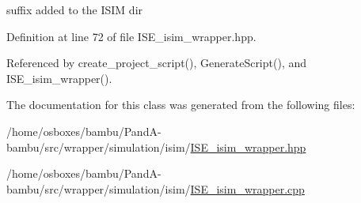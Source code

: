suffix added to the I\+S\+IM dir 



Definition at line 72 of file I\+S\+E\+\_\+isim\+\_\+wrapper.\+hpp.



Referenced by create\+\_\+project\+\_\+script(), Generate\+Script(), and I\+S\+E\+\_\+isim\+\_\+wrapper().



The documentation for this class was generated from the following files\+:\begin{DoxyCompactItemize}
\item 
/home/osboxes/bambu/\+Pand\+A-\/bambu/src/wrapper/simulation/isim/\hyperlink{ISE__isim__wrapper_8hpp}{I\+S\+E\+\_\+isim\+\_\+wrapper.\+hpp}\item 
/home/osboxes/bambu/\+Pand\+A-\/bambu/src/wrapper/simulation/isim/\hyperlink{ISE__isim__wrapper_8cpp}{I\+S\+E\+\_\+isim\+\_\+wrapper.\+cpp}\end{DoxyCompactItemize}
